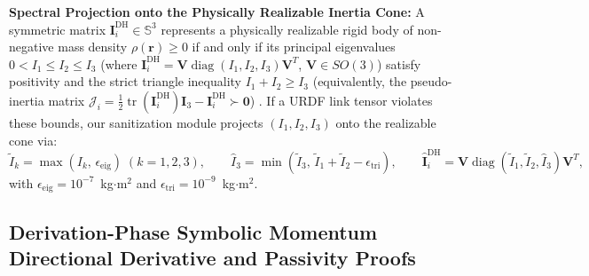 \documentclass[fleqn,10pt]{article}
\begin{document}
	\noindent\textbf{Spectral Projection onto the Physically Realizable Inertia Cone:} A symmetric matrix $\bm{I}_i^{\text{DH}} \in \mathbb{S}^3$ represents a physically realizable rigid body of non-negative mass density $\rho(\bm{r}) \ge 0$ if and only if its principal eigenvalues $0 < I_1 \le I_2 \le I_3$ (where $\bm{I}_i^{\text{DH}} = \bm{V}\operatorname{diag}(I_1, I_2, I_3)\bm{V}^T$, $\bm{V} \in SO(3)$) satisfy positivity and the strict triangle inequality $I_1 + I_2 \ge I_3$ (equivalently, the pseudo-inertia matrix $\bm{\mathcal{J}}_i = \frac{1}{2}\operatorname{tr}(\bm{I}_i^{\text{DH}})\bm{I}_3 - \bm{I}_i^{\text{DH}} \succ \bm{0}$) \cite{sousa2019physical}. If a URDF link tensor violates these bounds, our sanitization module projects $(I_1, I_2, I_3)$ onto the realizable cone via:
	\begin{equation}
		\tilde{I}_k = \max(I_k, \, \epsilon_{\text{eig}}) \; (k=1,2,3), \qquad \hat{I}_3 = \min\!\left(\tilde{I}_3, \, \tilde{I}_1 + \tilde{I}_2 - \epsilon_{\text{tri}}\right), \qquad \hat{\bm{I}}_i^{\text{DH}} = \bm{V}\operatorname{diag}(\tilde{I}_1, \tilde{I}_2, \hat{I}_3)\bm{V}^T,
		\label{eq:spectral_sanitization}
	\end{equation}
	with $\epsilon_{\text{eig}} = 10^{-7}$~kg$\cdot$m$^2$ and $\epsilon_{\text{tri}} = 10^{-9}$~kg$\cdot$m$^2$.
	
	\subsection*{Derivation-Phase Symbolic Momentum Directional Derivative and Passivity Proofs}
	
\end{document}
